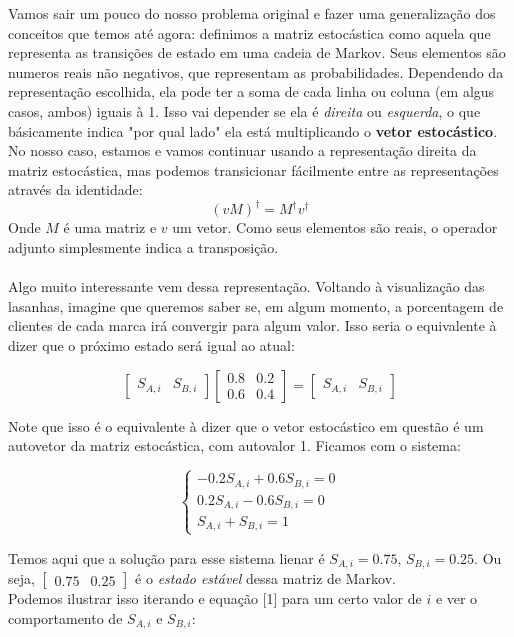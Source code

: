 \documentclass[12pt]{article}
\begin{document}
Vamos sair um pouco do nosso problema original e fazer uma generalização dos conceitos que temos até agora: definimos a matriz estocástica como aquela que representa as transições de estado em uma cadeia de Markov. Seus elementos são numeros reais não negativos, que representam as probabilidades. Dependendo da representação escolhida, ela pode ter a soma de cada linha ou coluna (em algus casos, ambos) iguais à 1. Isso vai depender se ela é \textit{direita} ou \textit{esquerda}, o que básicamente indica "por qual lado" ela está multiplicando o \textbf{vetor estocástico}. No nosso caso, estamos e vamos continuar usando a representação direita da matriz estocástica, mas podemos transicionar fácilmente entre as representações através da identidade:
\begin{equation}
(vM)^{\dagger} = M^{\dagger} v^{\dagger}
\end{equation}
Onde $M$ é uma matriz e $v$ um vetor. Como seus elementos são reais, o operador adjunto simplesmente indica a transposição.\\
\\
Algo muito interessante vem dessa representação. Voltando à visualização das lasanhas, imagine que queremos saber se, em algum momento, a porcentagem de clientes de cada marca irá convergir para algum valor. Isso seria o equivalente à dizer que o próximo estado será igual ao atual:

$$
\begin{bmatrix}
S_{A, i} & S_{B, i}
\end{bmatrix}
\begin{bmatrix}
0.8 & 0.2\\
0.6 & 0.4
\end{bmatrix}
=
\begin{bmatrix}
S_{A, i} & S_{B, i}
\end{bmatrix}
$$

Note que isso é o equivalente à dizer que o vetor estocástico em questão é um autovetor da matriz estocástica, com autovalor 1. Ficamos com o sistema:

$$
\left\{
\begin{array}{ll}
-0.2 S_{A, i} + 0.6 S_{B, i} = 0\\
0.2 S_{A, i}  - 0.6 S_{B, i} = 0\\
S_{A, i} + S_{B, i} = 1
\end{array}\right.
$$

Temos aqui que a solução para esse sistema lienar é $S_{A, i} = 0.75$, $S_{B, i} = 0.25$. Ou seja, $\begin{bmatrix} 0.75 & 0.25 \end{bmatrix}$ é o \textit{estado estável} dessa matriz de Markov.\\ 
Podemos ilustrar isso iterando e equação [1] para um certo valor de $i$ e ver o comportamento de $S_{A, i}$ e $S_{B, i}$:
\end{document}
